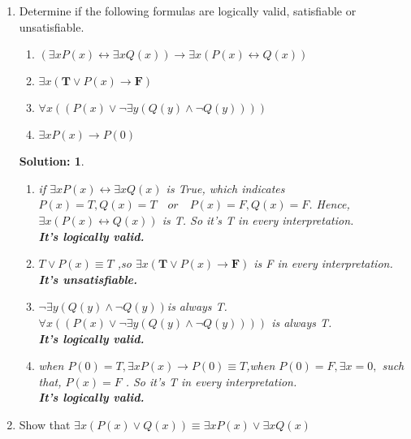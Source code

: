\documentclass{article}
\theoremstyle{break}
\newtheorem*{solution*}{\textbf{Solution:} }
\begin{document}
\begin{enumerate}
        \item Determine if the following formulas are logically valid, satisfiable or unsatisfiable.
        \begin{enumerate}
                \item $ (\exists x P(x) \leftrightarrow \exists x Q(x)) \to \exists x (P(x) \leftrightarrow Q(x))  $
                \item $\exists  x (\textbf{T} \lor P(x) \to \textbf{F})$
                \item $\forall x ((P(x) \lor \lnot \exists y (Q(y) \land \lnot Q(y))))$
                \item $ \exists x P(x) \to P(0)  $
        \end{enumerate}
        \begin{solution*}\leavevmode
                \begin{enumerate}
                        \item if $\exists x P(x) \leftrightarrow \exists x Q(x) $ is True, which indicates $P(x) = T, Q(x) = T \quad or \quad P(x)=F,Q(x)=F$. Hence, $\exists x (P(x) \leftrightarrow Q(x)) $ is T. So it's T in every interpretation. \\ \textbf{It's logically valid.}
                        \newline
                        \item $T \lor P(x) \equiv T $ ,so $\exists  x (\textbf{T} \lor P(x) \to \textbf{F})$ is F in every interpretation. \\ \textbf{It's unsatisfiable.}
                        \newline
                        \item $\lnot \exists y (Q(y) \land \lnot Q(y)) $is always T. $\forall x ((P(x) \lor \lnot \exists y (Q(y) \land \lnot Q(y))))$ is always T. \\\textbf{It's logically valid.}
                        \newline
                        \item when $P(0) = T, \exists x P(x) \to P(0) \equiv T$,when $P(0) = F, \exists x = 0, $ such that, $P(x) = F$ . So it's T in every interpretation.  \\ \textbf{It's logically valid.}
                        \newline
                \end{enumerate}
        \end{solution*}
        \newpage
        \item Show that $\exists x(P(x) \lor Q(x) ) \equiv \exists x P(x) \lor \exists x Q(x)$

\end{enumerate}
\end{document}
